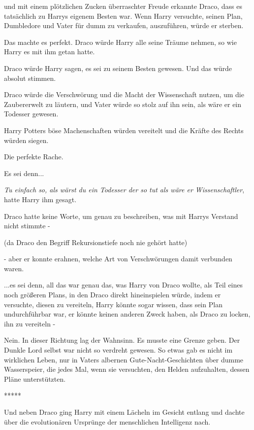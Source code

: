 und mit einem plötzlichen Zucken überraschter Freude erkannte Draco, dass es
tatsächlich zu Harrys eigenem Besten war. Wenn Harry versuchte, seinen Plan,
Dumbledore und Vater für dumm zu verkaufen, auszuführen, würde er sterben.

Das machte es perfekt. Draco würde Harry alle seine Träume nehmen, so wie Harry
es mit ihm getan hatte.

Draco würde Harry sagen, es sei zu seinem Besten gewesen. Und das würde absolut
stimmen.

Draco würde die Verschwörung und die Macht der Wissenschaft nutzen, um die
Zaubererwelt zu läutern, und Vater würde so stolz auf ihn sein, als wäre er ein
Todesser gewesen.

Harry Potters böse Machenschaften würden vereitelt und die Kräfte des Rechts
würden siegen.

Die perfekte Rache.

Es sei denn...

\emph{Tu einfach so, als wärst du ein Todesser der so tut als wäre er
Wissenschaftler}, hatte Harry ihm gesagt.

Draco hatte keine Worte, um genau zu beschreiben, was mit Harrys Verstand nicht
stimmte -

(da Draco den Begriff \glqq{}Rekursionstiefe\grqq{} noch nie gehört hatte)

- aber er konnte erahnen, welche Art von Verschwörungen damit verbunden waren.

...es sei denn, all das war genau das, was Harry von Draco wollte, als Teil
eines noch größeren Plans, in den Draco direkt hineinspielen würde, indem er
versuchte, diesen zu vereiteln, Harry könnte sogar wissen, dass sein Plan
undurchführbar war, er könnte keinen anderen Zweck haben, als Draco zu locken,
ihn zu vereiteln -

Nein. In dieser Richtung lag der Wahnsinn. Es musste eine Grenze geben. Der
Dunkle Lord selbst war nicht so verdreht gewesen. So etwas gab es nicht im
wirklichen Leben, nur in Vaters albernen Gute-Nacht-Geschichten über dumme
Wasserspeier, die jedes Mal, wenn sie versuchten, den Helden aufzuhalten, dessen
Pläne unterstützten.

\begin{center}*****\end{center}

Und neben Draco ging Harry mit einem Lächeln im Gesicht entlang und dachte über
die evolutionären Ursprünge der menschlichen Intelligenz nach.

